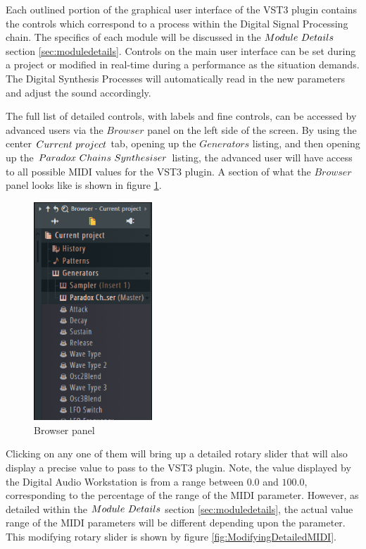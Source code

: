 \documentclass[a4paper,12pt]{report}
\begin{document}
Each outlined portion of the graphical user interface of the VST3 plugin contains the controls which correspond to a process within the Digital Signal Processing chain. The specifics of each module will be discussed in the $Module\ \-Details$ section \ref{sec:moduledetails}. Controls on the main user interface can be set during a project or modified in real-time during a performance as the situation demands. The Digital Synthesis Processes will automatically read in the new parameters and adjust the sound accordingly.

The full list of detailed controls, with labels and fine controls, can be accessed by advanced users via the $Browser$ panel on the left side of the screen. By using the center $Current\ \-project$ tab, opening up the $Generators$ listing, and then opening up the $Paradox\ \-Chains\ \-Synthesiser$ listing, the advanced user will have access to all possible MIDI values for the VST3 plugin. A section of what the $Browser$ panel looks like is shown in figure \ref{fig:browserpanel}.

\begin{figure}[h] \centering
\includegraphics[width=12em]{BrowserPanel2.png}
    \caption{Browser panel}     \label{fig:browserpanel} \end{figure}

Clicking on any one of them will bring up a detailed rotary slider that will also display a precise value to pass to the VST3 plugin. Note, the value displayed by the Digital Audio Workstation is from a range between $0.0$ and $100.0$, corresponding to the percentage of the range of the MIDI parameter. However, as detailed within the $Module\ \-Details$ section \ref{sec:moduledetails}, the actual value range of the MIDI parameters will be different depending upon the parameter. This modifying rotary slider is shown by figure \ref{fig:ModifyingDetailedMIDI}.
\end{document}
